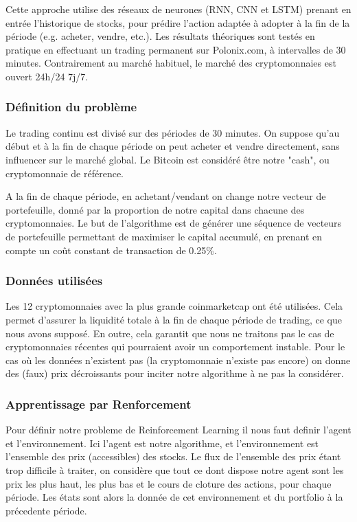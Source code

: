 \documentclass[a4paper]{article}
\begin{document}
Cette approche utilise des réseaux de neurones (RNN, CNN et LSTM) prenant en entrée l'historique de stocks, pour prédire l'action adaptée à adopter à la fin de la période (e.g. acheter, vendre, etc.). Les résultats théoriques sont testés en pratique en effectuant un trading permanent sur Polonix.com, à intervalles de 30 minutes. Contrairement au marché habituel, le marché des cryptomonnaies est ouvert 24h/24 7j/7.

\subsubsection{Définition du problème}

Le trading continu est divisé sur des périodes de 30 minutes. On suppose qu'au début et à la fin de chaque période on peut acheter et vendre directement, sans influencer sur le marché global. Le Bitcoin est considéré être notre "cash", ou cryptomonnaie de référence. 

A la fin de chaque période, en achetant/vendant on change notre vecteur de portefeuille, donné par la proportion de notre capital dans chacune des cryptomonnaies. Le but de l'algorithme est de générer une séquence de vecteurs de portefeuille permettant de maximiser le capital accumulé, en prenant en compte un coût constant de transaction de 0.25\%.

\subsubsection{Données utilisées}

Les 12 cryptomonnaies avec la plus grande coinmarketcap ont été utilisées. Cela permet d'assurer la liquidité totale à la fin de chaque période de trading, ce que nous avons supposé. En outre, cela garantit que nous ne traitons pas le cas de cryptomonnaies récentes qui pourraient avoir un comportement instable. Pour le cas où les données n'existent pas (la cryptomonnaie n'existe pas encore) on donne des (faux) prix décroissants pour inciter notre algorithme à ne pas la considérer.

\subsubsection{Apprentissage par Renforcement}

Pour définir notre probleme de Reinforcement Learning il nous faut definir l'agent et l'environnement. Ici l'agent est notre algorithme, et l'environnement est l'ensemble des prix (accessibles) des stocks. Le flux de l'ensemble des prix étant trop difficile à traiter, on considère que tout ce dont dispose notre agent sont les prix les plus haut, les plus bas et le cours de cloture des actions, pour chaque période. Les états sont alors la donnée de cet environnement et du portfolio à la précedente période.
\end{document}

